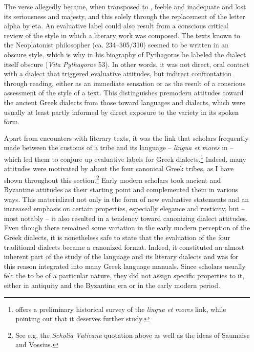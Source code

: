 The  verse allegedly became, when transposed to , feeble and inadequate and lost its seriousness and majesty, and this solely through the replacement of the letter alpha by eta. An evaluative label could also result from a conscious critical review of the style in which a literary work was composed. The  texts known to the Neoplatonist philosopher  (ca. 234–305/310) seemed to be written in an obscure style, which is why in his biography of Pythagoras he labeled the dialect itself obscure (\textit{Vita Pythagorae} 53). In other words, it was not direct, oral contact with a dialect that triggered evaluative attitudes, but indirect confrontation through reading, either as an immediate sensation or as the result of a conscious assessment of the style of a text. This distinguishes premodern attitudes toward the ancient Greek dialects from those toward  languages and dialects, which were usually at least partly informed by direct exposure to the variety in its spoken form.

Apart from encounters with literary texts, it was the link that scholars frequently made between the customs of a tribe and its language – \textit{lingua et mores} in  – which led them to conjure up evaluative labels for Greek dialects.\footnote{\citet{VanHal2013} offers a preliminary historical survey of the \textit{lingua et mores} link, while pointing out that it deserves further study.} Indeed, many attitudes were motivated by  about the four canonical Greek tribes, as I have shown throughout this section.\footnote{See e.g. the \textit{Scholia Vaticana} quotation above as well as the ideas of Saumaise and Vossius.} Early modern scholars took ancient and Byzantine attitudes as their starting point and complemented them in various ways. This materialized not only in the form of new evaluative statements and an increased emphasis on certain properties, especially  elegance and  rusticity, but – most notably – it also resulted in a tendency toward canonizing dialect attitudes. Even though there remained some variation in the early modern perception of the Greek dialects, it is nonetheless safe to state that the evaluation of the four traditional dialects became a canonized format. Indeed, it constituted an almost inherent part of the study of the  language and its literary dialects and was for this reason integrated into many Greek language manuals. Since scholars usually felt the  to be of a particular nature, they did not assign specific properties to it, either in antiquity and the Byzantine era or in the early modern period.

